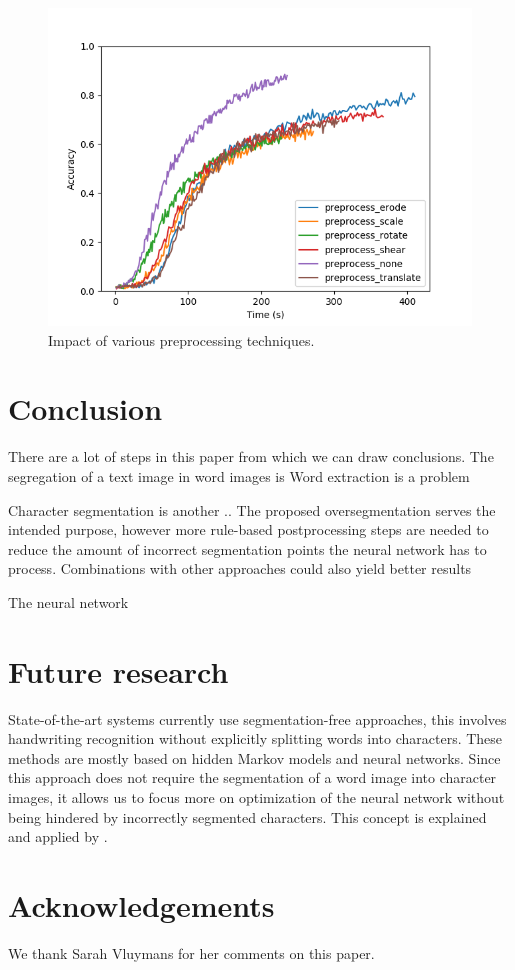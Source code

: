 \documentclass{article}
\begin{document}
\begin{figure}
\centering
    \includegraphics[width=\linewidth]{../Graphs/preprocess.png}
    \caption{Impact of various preprocessing techniques.}
    \label{fig:preprocess}
\end{figure}

\section{Conclusion}
There are a lot of steps in this paper from which we can draw conclusions.
The segregation of a text image in word images is  
Word extraction is a problem 

Character segmentation is another ..
The proposed oversegmentation serves the intended purpose, however more rule-based postprocessing steps are needed to reduce the amount of incorrect segmentation points the neural network has to process. Combinations with other approaches could also yield better results


The neural network 

\section{Future research}
State-of-the-art systems currently use segmentation-free approaches, this involves handwriting recognition without explicitly splitting words into characters. These methods are mostly based on hidden Markov models and neural networks.
Since this approach does not require the segmentation of a word image into character images, it allows us to focus more on optimization of the neural network without being hindered by incorrectly segmented characters.
This concept is explained and applied by \cite{presham}.
\section{Acknowledgements}
We thank Sarah Vluymans for her comments on this paper.


\end{document}
